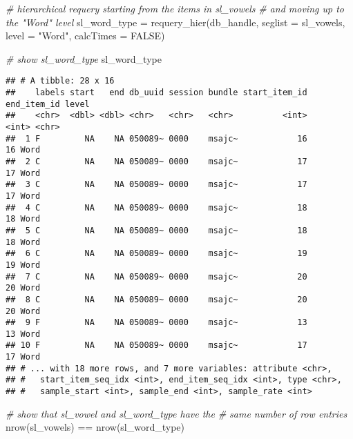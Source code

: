\documentclass[
]{book}
\newenvironment{Shaded}{\begin{snugshade}}{\end{snugshade}}
\newcommand{\AttributeTok}[1]{\textcolor[rgb]{0.77,0.63,0.00}{#1}}
\newcommand{\CommentTok}[1]{\textcolor[rgb]{0.56,0.35,0.01}{\textit{#1}}}
\newcommand{\ConstantTok}[1]{\textcolor[rgb]{0.00,0.00,0.00}{#1}}
\newcommand{\FunctionTok}[1]{\textcolor[rgb]{0.00,0.00,0.00}{#1}}
\newcommand{\NormalTok}[1]{#1}
\newcommand{\OtherTok}[1]{\textcolor[rgb]{0.56,0.35,0.01}{#1}}
\newcommand{\SpecialCharTok}[1]{\textcolor[rgb]{0.00,0.00,0.00}{#1}}
\newcommand{\StringTok}[1]{\textcolor[rgb]{0.31,0.60,0.02}{#1}}
\begin{document}
\begin{Shaded}
\begin{Highlighting}[]
\CommentTok{\# hierarchical requery starting from the items in sl\_vowels}
\CommentTok{\# and moving up to the "Word" level}
\NormalTok{sl\_word\_type }\OtherTok{=} \FunctionTok{requery\_hier}\NormalTok{(db\_handle,}
                           \AttributeTok{seglist =}\NormalTok{ sl\_vowels,}
                           \AttributeTok{level =} \StringTok{"Word"}\NormalTok{,}
                           \AttributeTok{calcTimes =} \ConstantTok{FALSE}\NormalTok{)}

\CommentTok{\# show sl\_word\_type}
\NormalTok{sl\_word\_type}
\end{Highlighting}
\end{Shaded}

\begin{verbatim}
## # A tibble: 28 x 16
##    labels start   end db_uuid session bundle start_item_id end_item_id level
##    <chr>  <dbl> <dbl> <chr>   <chr>   <chr>          <int>       <int> <chr>
##  1 F         NA    NA 050089~ 0000    msajc~            16          16 Word 
##  2 C         NA    NA 050089~ 0000    msajc~            17          17 Word 
##  3 C         NA    NA 050089~ 0000    msajc~            17          17 Word 
##  4 C         NA    NA 050089~ 0000    msajc~            18          18 Word 
##  5 C         NA    NA 050089~ 0000    msajc~            18          18 Word 
##  6 C         NA    NA 050089~ 0000    msajc~            19          19 Word 
##  7 C         NA    NA 050089~ 0000    msajc~            20          20 Word 
##  8 C         NA    NA 050089~ 0000    msajc~            20          20 Word 
##  9 F         NA    NA 050089~ 0000    msajc~            13          13 Word 
## 10 F         NA    NA 050089~ 0000    msajc~            17          17 Word 
## # ... with 18 more rows, and 7 more variables: attribute <chr>,
## #   start_item_seq_idx <int>, end_item_seq_idx <int>, type <chr>,
## #   sample_start <int>, sample_end <int>, sample_rate <int>
\end{verbatim}

\begin{Shaded}
\begin{Highlighting}[]
\CommentTok{\# show that sl\_vowel and sl\_word\_type have the}
\CommentTok{\# same number of row entries}
\FunctionTok{nrow}\NormalTok{(sl\_vowels) }\SpecialCharTok{==} \FunctionTok{nrow}\NormalTok{(sl\_word\_type)}
\end{Highlighting}
\end{Shaded}
\end{document}

